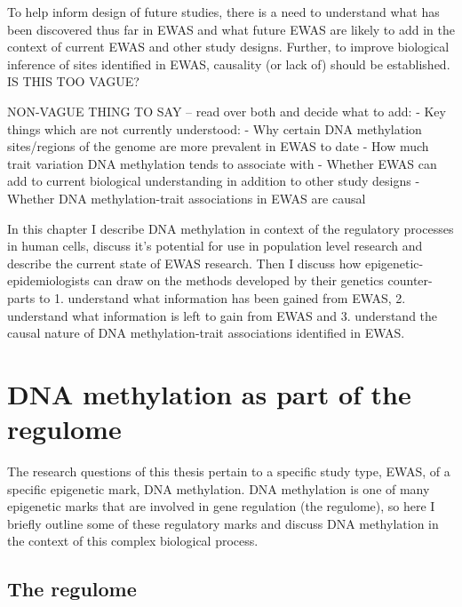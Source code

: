 \documentclass[11pt,twoside]{bristolthesis}
\begin{document}
To help inform design of future studies, there is a need to understand what has been discovered thus far in EWAS and what future EWAS are likely to add in the context of current EWAS and other study designs. Further, to improve biological inference of sites identified in EWAS, causality (or lack of) should be established. IS THIS TOO VAGUE?

NON-VAGUE THING TO SAY -- read over both and decide what to add:
- Key things which are not currently understood:
- Why certain DNA methylation sites/regions of the genome are more prevalent in EWAS to date
- How much trait variation DNA methylation tends to associate with
- Whether EWAS can add to current biological understanding in addition to other study designs
- Whether DNA methylation-trait associations in EWAS are causal

In this chapter I describe DNA methylation in context of the regulatory processes in human cells, discuss it's potential for use in population level research and describe the current state of EWAS research. Then I discuss how epigenetic-epidemiologists can draw on the methods developed by their genetics counter-parts to 1. understand what information has been gained from EWAS, 2. understand what information is left to gain from EWAS and 3. understand the causal nature of DNA methylation-trait associations identified in EWAS.

\hypertarget{dna-methylation-as-part-of-the-regulome}{%
\section{DNA methylation as part of the regulome}\label{dna-methylation-as-part-of-the-regulome}}

The research questions of this thesis pertain to a specific study type, EWAS, of a specific epigenetic mark, DNA methylation. DNA methylation is one of many epigenetic marks that are involved in gene regulation (the regulome), so here I briefly outline some of these regulatory marks and discuss DNA methylation in the context of this complex biological process.

\hypertarget{the-regulome}{%
\subsection{The regulome}\label{the-regulome}}
\end{document}
